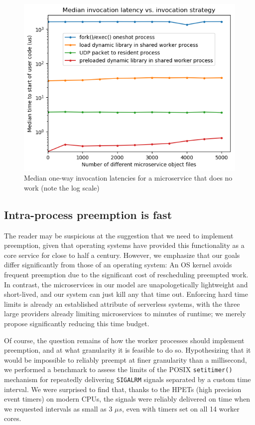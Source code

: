 \begin{figure}
\includegraphics[width=\columnwidth]{figs/2018-02-02-motivation_numfuns-latency-reordered}
\caption{Median one-way invocation latencies for a microservice that does no work (note the log scale)}
\label{fig:motive}
\end{figure}

\subsection{Intra-process preemption is fast}
The reader may be suspicious at the suggestion that we need to implement preemption,
given that operating systems have provided this functionality as a core service for
close to half a century.  However, we emphasize that our goals differ significantly
from those of an operating system:  An OS kernel avoids frequent preemption due to
the significant cost of rescheduling preempted work.  In contrast, the microservices
in our model are unapologetically lightweight and short-lived, and our system can
just kill any that time out.  Enforcing hard time limits is already an established
attribute of serverless systems, with the three large providers already limiting
microservices to minutes of runtime; we merely propose significantly reducing this
time budget.

Of course, the question remains of how the worker processes should implement
preemption, and at what granularity it is feasible to do so.  Hypothesizing that it
would be impossible to reliably preempt at finer granularity than a millisecond, we
performed a benchmark to assess the limits of the POSIX \texttt{setitimer()}
mechanism for repeatedly delivering \texttt{SIGALRM} signals separated by a custom
time interval.  We were surprised to find that, thanks to the HPETs (high precision
event timers) on modern CPUs, the signals were reliably delivered on time when we
requested intervals as small as 3 $\mu{}s$, even with timers set on all 14 worker
cores.
